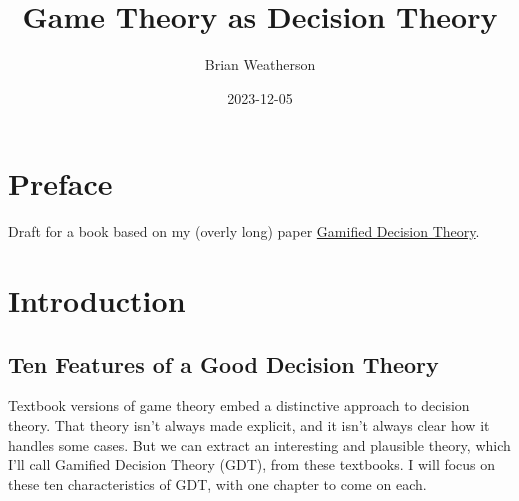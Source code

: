 \documentclass[
  12pt,
  letterpaper,
  DIV=11,
  numbers=noendperiod]{scrreprt}
\title{Game Theory as Decision Theory}
\author{Brian Weatherson}
\date{2023-12-05}
\renewcommand*\contentsname{Table of contents}
\newcommand\contentsname{Table of contents}
\begin{document}
\maketitle
\renewcommand*\contentsname{Table of contents}
{
\hypersetup{linkcolor=}
\setcounter{tocdepth}{2}
\tableofcontents
}

\chapter*{Preface}\label{preface}


Draft for a book based on my (overly long) paper
\href{https://brian.weatherson.org/gdt/gdt.html}{Gamified Decision
Theory}.


\chapter{Introduction}\label{sec-intro}

\section{Ten Features of a Good Decision Theory}\label{sec-ten-features}

Textbook versions of game theory embed a distinctive approach to
decision theory. That theory isn't always made explicit, and it isn't
always clear how it handles some cases. But we can extract an
interesting and plausible theory, which I'll call Gamified Decision
Theory (GDT), from these textbooks. I will focus on these ten
characteristics of GDT, with one chapter to come on each.
\end{document}
